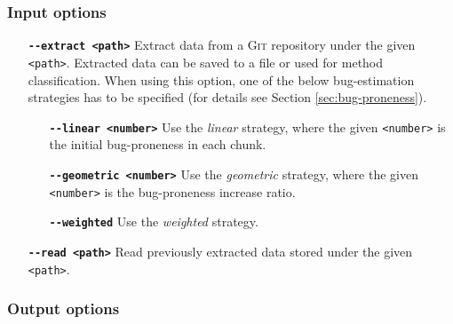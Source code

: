 \documentclass{pracamgr}
\newcommand{\clopt}[1]{\texttt{\textbf{-{}-#1}}}
\begin{document}
\subsubsection*{Input options}

\begin{itemize}[leftmargin=1.5in]

\item[\clopt{extract <path>}] Extract data from a \textsc{Git} repository under the given \texttt{<path>}. Extracted data can be saved to a file or used for method classification. When using this option, one of the below bug-estimation strategies has to be specified (for details see Section \ref{sec:bug-proneness}).

	\begin{itemize}[leftmargin=0.5in]
	\item[\clopt{linear <number>}] Use the \emph{linear} strategy, where the given \texttt{<number>} is the initial bug-proneness in each chunk.
	\item[\clopt{geometric <number>}] Use the \emph{geometric} strategy, where the given \texttt{<number>} is the bug-proneness increase ratio.
	\item[\clopt{weighted}] Use the \emph{weighted} strategy.
	\end{itemize}

\item[\clopt{read <path>}] Read previously extracted data stored under the given \texttt{<path>}.

\end{itemize}

\subsubsection*{Output options}
\end{document}
